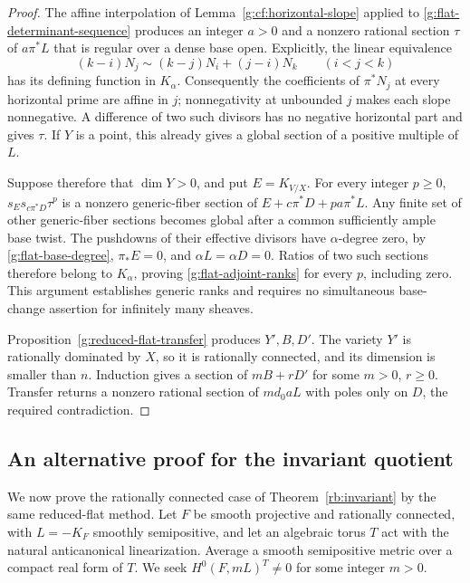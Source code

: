 \begin{proof}
The affine interpolation of Lemma~\ref{g:cf:horizontal-slope} applied
to \eqref{g:flat-determinant-sequence} produces an integer \(a>0\) and
a nonzero rational section \(\tau\) of \(a\pi^*L\) that is regular over
a dense base open.  Explicitly, the linear equivalence
\[
                (k-i)N_j\sim(k-j)N_i+(j-i)N_k
                    \qquad(i<j<k)
\]
has its defining function in \(K_\alpha\).  Consequently the
coefficients of \(\pi^*N_j\) at every horizontal prime are affine in
\(j\); nonnegativity at unbounded \(j\) makes each slope nonnegative.
A difference of two such divisors has no negative horizontal part and
gives \(\tau\).  If \(Y\) is a point, this already gives a global
section of a positive multiple of \(L\).

Suppose therefore that \(\dim Y>0\), and put \(E=K_{V/X}\).
For every integer \(p\ge0\),
\(s_Es_{c\pi^*D}\tau^p\) is a nonzero generic-fiber section of
\(E+c\pi^*D+pa\pi^*L\).  Any finite set of other generic-fiber
sections becomes global after a common sufficiently ample base twist.
The pushdowns of their effective divisors have \(\alpha\)-degree zero,
by \eqref{g:flat-base-degree}, \(\pi_*E=0\), and
\(\alpha L=\alpha D=0\).  Ratios of two such sections therefore
belong to \(K_\alpha\), proving
\eqref{g:flat-adjoint-ranks} for every \(p\), including zero.
This argument establishes generic ranks and requires no simultaneous
base-change assertion for infinitely many sheaves.

Proposition~\ref{g:reduced-flat-transfer} produces \(Y',B,D'\).
The variety \(Y'\) is rationally dominated by \(X\), so it is
rationally connected, and its dimension is smaller than \(n\).
Induction gives a section of \(mB+rD'\) for some \(m>0\), \(r\ge0\).
Transfer returns a nonzero rational section of \(md_0aL\) with poles
only on \(D\), the required contradiction.
\end{proof}

\subsection{An alternative proof for the invariant quotient}
\label{g:flat-invariant-application}

We now prove the rationally connected case of Theorem~\ref{rb:invariant}
by the same reduced-flat method. Let \(F\) be smooth projective and
rationally connected, with \(L=-K_F\) smoothly semipositive, and let an
algebraic torus \(T\) act with the natural anticanonical linearization.
Average a smooth semipositive metric over a compact real form of \(T\).
We seek \(H^0(F,mL)^T\ne0\) for some integer \(m>0\).

